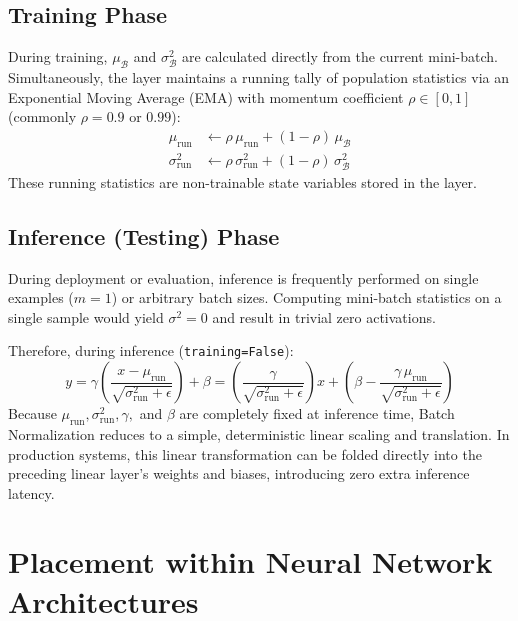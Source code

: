 \documentclass[12pt,a4paper]{article}
\begin{document}
\subsection{Training Phase}
During training, $\mu_{\mathcal{B}}$ and $\sigma_{\mathcal{B}}^2$ are calculated directly from the current mini-batch. Simultaneously, the layer maintains a running tally of population statistics via an Exponential Moving Average (EMA) with momentum coefficient $\rho \in [0, 1]$ (commonly $\rho = 0.9$ or $0.99$):
\begin{align}
\mu_{\text{run}} &\leftarrow \rho \, \mu_{\text{run}} + (1 - \rho) \, \mu_{\mathcal{B}} \\
\sigma^2_{\text{run}} &\leftarrow \rho \, \sigma^2_{\text{run}} + (1 - \rho) \, \sigma_{\mathcal{B}}^2
\end{align}
These running statistics are non-trainable state variables stored in the layer.

\subsection{Inference (Testing) Phase}
During deployment or evaluation, inference is frequently performed on single examples ($m = 1$) or arbitrary batch sizes. Computing mini-batch statistics on a single sample would yield $\sigma^2 = 0$ and result in trivial zero activations. 

Therefore, during inference (\texttt{training=False}):
\begin{equation}
y = \gamma \left( \frac{x - \mu_{\text{run}}}{\sqrt{\sigma^2_{\text{run}} + \epsilon}} \right) + \beta = \left( \frac{\gamma}{\sqrt{\sigma^2_{\text{run}} + \epsilon}} \right) x + \left( \beta - \frac{\gamma \, \mu_{\text{run}}}{\sqrt{\sigma^2_{\text{run}} + \epsilon}} \right)
\end{equation}
Because $\mu_{\text{run}}, \sigma^2_{\text{run}}, \gamma,$ and $\beta$ are completely fixed at inference time, Batch Normalization reduces to a simple, deterministic linear scaling and translation. In production systems, this linear transformation can be folded directly into the preceding linear layer's weights and biases, introducing zero extra inference latency.

\section{Placement within Neural Network Architectures}
\end{document}
